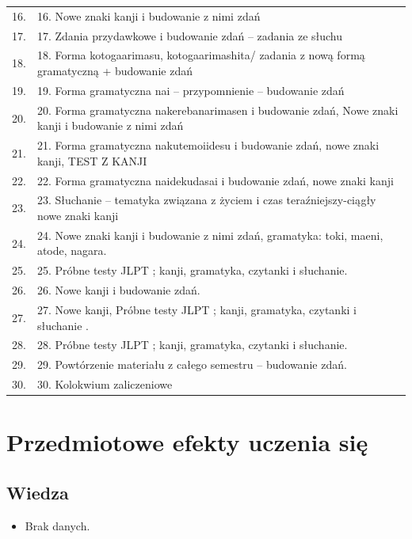 \documentclass[12pt, a4paper]{article}
\begin{document}
{\begin{longtable}{m{1.5cm}m{14.5cm}}
  \rowcolor{tableRowAlt} 16. & 16.  Nowe znaki kanji i budowanie z nimi zdań \\
  \rowcolor{tableRowLight} 17. & 17. Zdania przydawkowe i budowanie zdań – zadania ze słuchu \\
  \rowcolor{tableRowAlt} 18. & 18. Forma kotogaarimasu, kotogaarimashita/ zadania z nową formą gramatyczną + budowanie zdań \\
  \rowcolor{tableRowLight} 19. & 19.  Forma gramatyczna nai – przypomnienie – budowanie zdań \\
  \rowcolor{tableRowAlt} 20. & 20.  Forma gramatyczna  nakerebanarimasen i budowanie zdań, Nowe znaki kanji i budowanie z nimi zdań \\
  \rowcolor{tableRowLight} 21. & 21. Forma gramatyczna nakutemoiidesu i budowanie zdań, nowe znaki kanji, TEST Z KANJI \\
  \rowcolor{tableRowAlt} 22. & 22. Forma gramatyczna naidekudasai i budowanie zdań, nowe znaki kanji \\
  \rowcolor{tableRowLight} 23. & 23. Słuchanie – tematyka związana z życiem i czas teraźniejszy-ciągły nowe znaki kanji \\
  \rowcolor{tableRowAlt} 24. & 24.  Nowe znaki kanji i budowanie z nimi zdań, gramatyka: toki, maeni, atode, nagara. \\
  \rowcolor{tableRowLight} 25. & 25.  Próbne testy JLPT ; kanji, gramatyka, czytanki i słuchanie. \\
  \rowcolor{tableRowAlt} 26. & 26.  Nowe kanji i budowanie zdań. \\
  \rowcolor{tableRowLight} 27. & 27.  Nowe kanji,  Próbne testy JLPT ; kanji, gramatyka, czytanki i słuchanie . \\
  \rowcolor{tableRowAlt} 28. & 28.  Próbne testy JLPT ; kanji, gramatyka, czytanki i słuchanie. \\
  \rowcolor{tableRowLight} 29. & 29.  Powtórzenie materiału z całego semestru – budowanie zdań. \\
  \rowcolor{tableRowAlt} 30. & 30.  Kolokwium zaliczeniowe \\
\bottomrule
\end{longtable}}

\section{Przedmiotowe efekty uczenia się}

\subsection*{Wiedza}
\begin{itemize}
  \item Brak danych.
\end{itemize}
\end{document}
